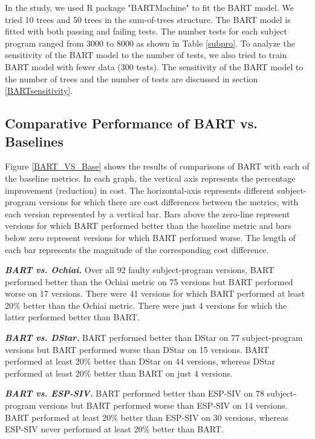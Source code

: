 In the study, we used R package "BARTMachine" \cite{BARTMachine} to fit the BART model. We tried 10 trees and 50 trees in the sum-of-trees structure.  The BART model is fitted with both passing and failing tests. The number tests for each subject program ranged from 3000 to 8000 as shown in Table \ref{subpro}. To analyze the sensitivity of the BART model to the number of  tests, we also tried to train BART model with fewer data (300 tests). The sensitivity of the BART model to the number of trees and the number of tests are discussed in section \ref{BARTsensitivity}.

\subsection{Comparative Performance of BART vs. Baselines}

Figure \ref{BART_VS_Base} shows the results of comparisons of BART with each of the baseline metrics.  In each graph, the vertical axis represents the percentage improvement (reduction) in cost. The horizontal-axis represents different subject-program versions for which there are cost differences between the metrics, with each version represented by a vertical bar.   Bars above the zero-line represent versions for which BART performed better than the baseline metric and bars below zero represent versions for which BART performed worse.  The length of each bar represents the magnitude of the corresponding cost difference.

\textit{\textbf{ BART vs. Ochiai.}}  Over all 92 faulty subject-program versions, BART performed better than the Ochiai metric on 75 versions but BART performed worse on 17 versions.  There were 41 versions for which BART performed at least 20\% better than the Ochiai metric.  There were just 4 versions for which the latter performed better than BART.

\textit{\textbf{ BART vs. DStar.}}  BART performed better than DStar on 77 subject-program versions but BART performed worse than DStar on 15 versions.  BART performed at least 20\% better than DStar on 44 versions, whereas DStar performed at least 20\% better than BART on just 4 versions.

\textit{\textbf{ BART vs. ESP-SIV.}} BART performed better than ESP-SIV on 78 subject-program versions but BART performed worse than ESP-SIV on 14 versions.  BART performed at least 20\% better than ESP-SIV on 30 versions, whereas ESP-SIV never performed at least 20\% better than BART.

